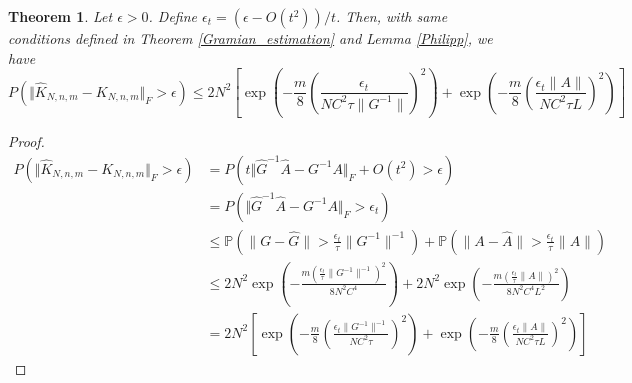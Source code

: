 \documentclass{article}[11]
\newtheorem{theorem}{Theorem}
\begin{document}
\begin{theorem}
	Let $\epsilon>0$. Define $\epsilon_t = \left(\epsilon - O(t^2)\right)/t$. Then, with same conditions defined in Theorem \ref{Gramian_estimation} and Lemma \ref{Philipp}, we have
	\begin{equation*}
		P\left(\Vert \widehat{K}_{N,n,m} - K_{N,n,m} \Vert_F > \epsilon \right) \leq 2N^2 \left[ \exp \left( -\frac{m}{8} \left(\frac{\epsilon_t}{N C^2 \tau \|G^{-1}\|}\right)^2 \right) + \exp \left( -\frac{m}{8} \left(\frac{\epsilon_t \|A\|}{N C^2 \tau L}\right)^2 \right) \right]
	\end{equation*}  
\end{theorem}
\begin{proof}
	\begin{align*}
		P\left(\Vert \widehat{K}_{N,n,m} - K_{N,n,m} \Vert_F > \epsilon \right) 
		&= P\left( t\Vert \widehat{G}^{-1} \widehat{A} - G^{-1}A \Vert_F + O(t^2) > \epsilon \right) \\
		&= P\left( \Vert \widehat{G}^{-1} \widehat{A} - G^{-1}A \Vert_F  > \epsilon_t \right) \\
		&\leq \mathbb{P}\left(\|G - \widehat{G}\| > \frac{\epsilon_t}{\tau} \|G^{-1}\|^{-1} \right) + \mathbb{P}\left(\|A - \widehat{A}\| > \frac{\epsilon_t}{\tau} \|A\| \right) \\
		&\leq 2N^2 \exp \left( -\frac{m (\frac{\epsilon_t}{\tau} \|G^{-1}\|^{-1})^2}{8 N^2 C^4} \right) + 2N^2 \exp \left( -\frac{m (\frac{\epsilon_t}{\tau} \|A\|)^2}{8 N^2 C^4 L^2} \right) \\
		&= 2N^2 \left[ \exp \left( -\frac{m}{8} \left(\frac{\epsilon_t \|G^{-1}\|^{-1}}{N C^2 \tau}\right)^2 \right) + \exp \left( -\frac{m}{8} \left(\frac{\epsilon_t \|A\|}{N C^2 \tau L}\right)^2 \right) \right]
	\end{align*}  
\end{proof}
\end{document}
